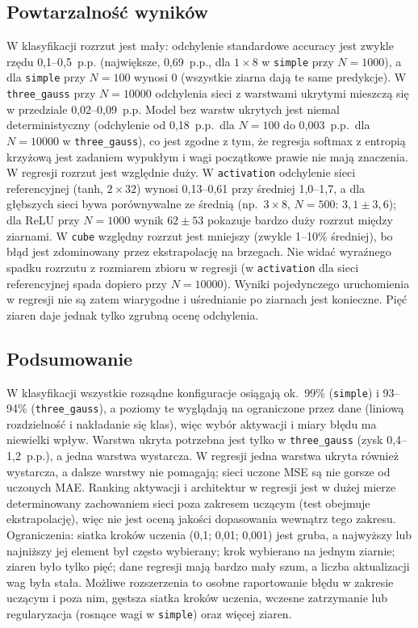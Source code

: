 \documentclass[11pt,a4paper]{article}
\begin{document}
	\subsection{Powtarzalność wyników}
	W klasyfikacji rozrzut jest mały: odchylenie standardowe accuracy jest zwykle rzędu 0,1--0,5~p.p. (największe, 0,69~p.p., dla $1\times8$ w \texttt{simple} przy $N=1000$), a dla \texttt{simple} przy $N=100$ wynosi 0 (wszystkie ziarna dają te same predykcje). W \texttt{three\_gauss} przy $N=10000$ odchylenia sieci z warstwami ukrytymi mieszczą się w przedziale 0,02--0,09~p.p. Model bez warstw ukrytych jest niemal deterministyczny (odchylenie od 0,18~p.p.\ dla $N=100$ do 0,003~p.p.\ dla $N=10000$ w \texttt{three\_gauss}), co jest zgodne z tym, że regresja softmax z entropią krzyżową jest zadaniem wypukłym i wagi początkowe prawie nie mają znaczenia.
	W regresji rozrzut jest względnie duży. W \texttt{activation} odchylenie sieci referencyjnej (tanh, $2\times32$) wynosi 0,13--0,61 przy średniej 1,0--1,7, a dla głębszych sieci bywa porównywalne ze średnią (np.\ $3\times8$, $N=500$: $3{,}1\pm3{,}6$); dla ReLU przy $N=1000$ wynik $62\pm53$ pokazuje bardzo duży rozrzut między ziarnami. W \texttt{cube} względny rozrzut jest mniejszy (zwykle 1--10\% średniej), bo błąd jest zdominowany przez ekstrapolację na brzegach. Nie widać wyraźnego spadku rozrzutu z rozmiarem zbioru w regresji (w \texttt{activation} dla sieci referencyjnej spada dopiero przy $N=10000$). Wyniki pojedynczego uruchomienia w regresji nie są zatem wiarygodne i uśrednianie po ziarnach jest konieczne. Pięć ziaren daje jednak tylko zgrubną ocenę odchylenia.
	
	\subsection{Podsumowanie}
	W klasyfikacji wszystkie rozsądne konfiguracje osiągają ok.\ 99\% (\texttt{simple}) i 93--94\% (\texttt{three\_gauss}), a poziomy te wyglądają na ograniczone przez dane (liniową rozdzielność i nakładanie się klas), więc wybór aktywacji i miary błędu ma niewielki wpływ. Warstwa ukryta potrzebna jest tylko w \texttt{three\_gauss} (zysk 0,4--1,2~p.p.), a jedna warstwa wystarcza. W regresji jedna warstwa ukryta również wystarcza, a dalsze warstwy nie pomagają; sieci uczone MSE są nie gorsze od uczonych MAE. Ranking aktywacji i architektur w regresji jest w dużej mierze determinowany zachowaniem sieci poza zakresem uczącym (test obejmuje ekstrapolację), więc nie jest oceną jakości dopasowania wewnątrz tego zakresu.
	Ograniczenia: siatka kroków uczenia (0,1; 0,01; 0,001) jest gruba, a najwyższy lub najniższy jej element był często wybierany; krok wybierano na jednym ziarnie; ziaren było tylko pięć; dane regresji mają bardzo mały szum, a liczba aktualizacji wag była stała. Możliwe rozszerzenia to osobne raportowanie błędu w zakresie uczącym i poza nim, gęstsza siatka kroków uczenia, wczesne zatrzymanie lub regularyzacja (rosnące wagi w \texttt{simple}) oraz więcej ziaren.
	
	
	
	
\end{document}
